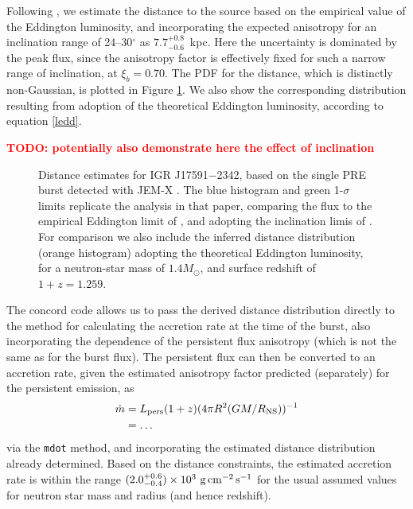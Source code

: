 \documentclass{aastex63}
\newcommand{\todo}[1]{\textbf{\textcolor{red}{TODO: #1}}} %
\begin{document}
Following \cite{kuiper20}, we estimate the distance to the source based on the empirical value of the Eddington luminosity, and incorporating the expected anisotropy for an inclination range of 
24--30$^\circ$ \cite[]{sanna18} as $7.7_{-0.6}^{+0.8}$~kpc. Here the uncertainty is dominated by the peak flux, since the anisotropy factor is effectively fixed for such a narrow range of inclination, at $\xi_b=0.70$.
%
The PDF for the distance, which is distinctly non-Gaussian, is plotted in Figure \ref{fig:dist_igr17591}. We also show the corresponding distribution resulting from adoption of the theoretical Eddington luminosity, according to equation \ref{ledd}.

\todo{potentially also demonstrate here the effect of inclination}

\begin{figure}[ht!]
\caption{Distance estimates for IGR J17591$-$2342, based on the single PRE burst detected with JEM-X \cite[]{kuiper20}. The blue histogram and green 1-$\sigma$ limits replicate the analysis in that paper, comparing the flux to the empirical Eddington limit of \cite[]{kuul03a}, and adopting the inclination limis of \cite[]{sanna18}.  For comparison we also include the inferred distance distribution (orange histogram) adopting the theoretical Eddington luminosity, for a neutron-star mass of $1.4M_\odot$, and surface redshift of $1+z=1.259$.
\label{fig:dist_igr17591}}
\end{figure}

The {\sc concord} code allows us to pass the derived distance distribution directly to the method for calculating the accretion rate at the time of the burst, also incorporating the dependence of the persistent flux anisotropy (which is not the same as for the burst flux).
%
The persistent flux can then be converted to an accretion rate, given the estimated anisotropy factor predicted (separately) for the persistent emission, as
\begin{eqnarray}
\dot{m} & = L_{\rm pers} (1+z) (4\pi R^2(GM/R_{\rm NS}))^{-1}\\
& = \ldots
\end{eqnarray}
via the {\tt mdot} method, and incorporating the estimated distance distribution already determined. 
%
Based on the distance constraints, the estimated accretion rate  is within the range $(2.0_{-0.4}^{+0.6})\times10^3\ \rm{g\,cm^{-2}\,s^{-1}}$ for the usual assumed values for neutron star mass and radius (and hence redshift).
\end{document}
